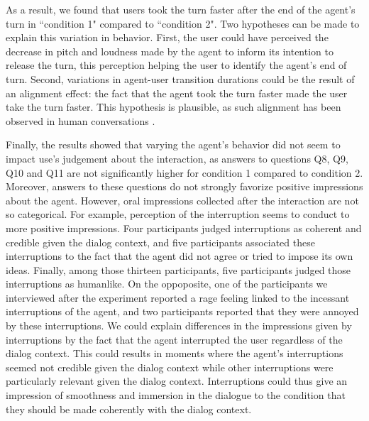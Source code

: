  As a result, we found that users took the turn faster after the end of the agent's turn in ``condition 1" compared to ``condition 2". Two hypotheses can be made to explain this variation in behavior. First, the user could have perceived the decrease in pitch and loudness made by the agent to inform its intention to release the turn, this perception helping the user to identify the agent's end of turn. Second, variations in agent-user transition durations could be the result of an alignment effect: the fact that the agent took the turn faster made the user take the turn faster. This hypothesis is plausible, as such alignment has been observed in human conversations \citep{levitan_entrainment_2015}.  

Finally, the results showed that varying the agent's behavior did not seem to impact use's judgement about the interaction, as answers to questions Q8, Q9, Q10 and Q11 are not significantly higher for condition 1 compared to condition 2. Moreover, answers to these questions do not strongly favorize positive impressions about the agent. However, oral impressions collected after the interaction are not so categorical.   
For example, perception of the interruption seems to conduct to more positive impressions. Four participants judged interruptions as coherent and credible given the dialog context, and five participants associated these interruptions to the fact that the agent did not agree or tried to impose its own ideas. Finally, among those thirteen participants, five participants judged those interruptions as humanlike. On the oppoposite, one of the participants we interviewed after the experiment reported a rage feeling linked to the incessant interruptions of the agent, and two participants reported that they were annoyed by these interruptions. We could explain differences in the impressions given by interruptions by the fact that the agent interrupted the user regardless of the dialog context. This could results in moments where the agent's interruptions seemed not credible given the dialog context while other interruptions were particularly relevant given the dialog context. Interruptions could thus give an impression of smoothness and immersion in the dialogue to the condition that they should be made coherently with the dialog context. 



